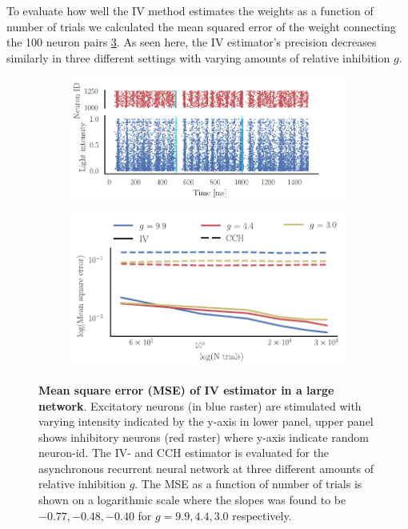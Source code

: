 \documentclass[11pt]{article}
\begin{document}
To evaluate how well the IV method estimates the weights as a function of number of trials we calculated the mean squared error of the weight connecting the 100 neuron pairs \cref{fig:error}. As seen here, the IV estimator's precision decreases similarly in three different settings with varying amounts of relative inhibition $ g $.
\begin{figure}
\makeatletter
\renewcommand\p@subfigure{}
\makeatother
\begin{subfigure}{\textwidth} 
\includegraphics[scale=1]{network-raster}
\caption{} \label{fig:error:raster}
\end{subfigure}\medskip

\begin{subfigure}{\textwidth} 
\includegraphics[scale=1]{mse_pos}
\caption{} \label{fig:error:mse}
\end{subfigure}
\caption{{\bf Mean square error (MSE) of IV estimator in a large network}.  Excitatory neurons (in blue raster) are stimulated with varying intensity indicated by the y-axis in lower panel, upper panel shows inhibitory neurons (red raster) where y-axis indicate random neuron-id.  The IV- and CCH estimator is evaluated for the asynchronous recurrent neural network at three different amounts of relative inhibition $ g $. The MSE as a function of number of trials is shown on a logarithmic scale where the slopes was found to be $ -0.77, -0.48, -0.40 $ for $g = 9.9, 4.4, 3.0$ respectively. \label{fig:error}}
\end{figure}
\end{document}
